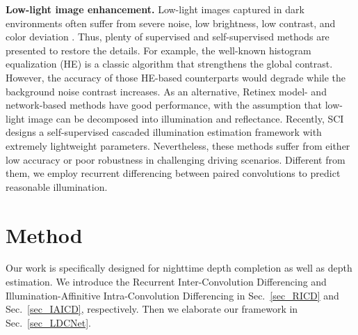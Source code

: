 \documentclass{article}
\begin{document}
\textbf{Low-light image enhancement.} 
Low-light images captured in dark environments often suffer from severe noise, low brightness, low contrast, and color deviation \cite{li2021learning,zhang2023fast}. Thus, plenty of supervised \cite{wang2019underexposed,zhang2021beyond,zhang2021better} and self-supervised \cite{jiang2021enlightengan,guo2020zero,zhang2021self,li2021learning,ma2022toward} methods are presented to restore the details. For example, the well-known histogram equalization (HE) \cite{pizer1987adaptive} is a classic algorithm that strengthens the global contrast. %
However, the accuracy of those HE-based counterparts would degrade while the background noise contrast increases. As an alternative, Retinex model- and network-based methods \cite{jobson1997multiscale,guo2016lime,zhang2021beyond,liu2021retinex} have good performance, with the assumption that low-light image can be decomposed into illumination and reflectance. Recently, SCI \cite{ma2022toward} designs a self-supervised cascaded illumination estimation framework with extremely lightweight parameters. Nevertheless, these methods suffer from either low accuracy or poor robustness in challenging driving scenarios. Different from them, we employ recurrent differencing between paired convolutions to predict reasonable illumination. 



\section{Method}
Our work is specifically designed for nighttime depth completion as well as depth estimation. We introduce the Recurrent Inter-Convolution Differencing and Illumination-Affinitive Intra-Convolution Differencing in Sec.~\ref{sec_RICD} and Sec.~\ref{sec_IAICD}, respectively. Then we elaborate our framework in Sec.~\ref{sec_LDCNet}. 
\end{document}

